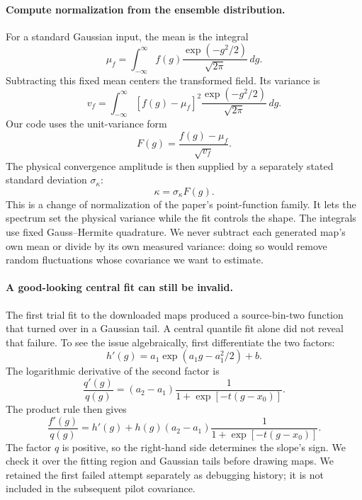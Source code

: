 \documentclass[11pt]{article}
\begin{document}
\paragraph{Compute normalization from the ensemble distribution.}
For a standard Gaussian input, the mean is the integral
\begin{equation}
 \mu_f=\int_{-\infty}^{\infty}
       f(g)\frac{\exp(-g^2/2)}{\sqrt{2\pi}}\,dg.
\end{equation}
Subtracting this fixed mean centers the transformed field. Its variance is
\begin{equation}
 v_f=\int_{-\infty}^{\infty}
       [f(g)-\mu_f]^2\frac{\exp(-g^2/2)}{\sqrt{2\pi}}\,dg.
\end{equation}
Our code uses the unit-variance form
\begin{equation}
 F(g)=\frac{f(g)-\mu_f}{\sqrt{v_f}}.
\end{equation}
The physical convergence amplitude is then supplied by a separately stated
standard deviation $\sigma_\kappa$:
\begin{equation}
 \kappa=\sigma_\kappa F(g).
\end{equation}
This is a change of normalization of the paper's point-function family.
It lets the spectrum set the physical variance while the fit controls the
shape. The integrals use fixed Gauss--Hermite quadrature. We never subtract
each generated map's own mean or divide by its own measured variance: doing
so would remove random fluctuations whose covariance we want to estimate.

\paragraph{A good-looking central fit can still be invalid.}
The first trial fit to the downloaded maps produced a source-bin-two
function that turned over in a Gaussian tail. A central quantile fit alone
did not reveal that failure. To see the issue algebraically, first
differentiate the two factors:
\begin{equation}
 h'(g)=a_1\exp(a_1g-a_1^2/2)+b.
\end{equation}
The logarithmic derivative of the second factor is
\begin{equation}
 \frac{q'(g)}{q(g)}=(a_2-a_1)
                   \frac1{1+\exp[-t(g-x_0)]}.
\end{equation}
The product rule then gives
\begin{equation}
 \frac{f'(g)}{q(g)}=h'(g)+h(g)(a_2-a_1)
                   \frac1{1+\exp[-t(g-x_0)]}.
\end{equation}
The factor $q$ is positive, so the right-hand side determines the slope's
sign. We check it over the fitting region and Gaussian tails before drawing
maps. We retained the first failed attempt separately as debugging history;
it is not included in the subsequent pilot covariance.
\end{document}
